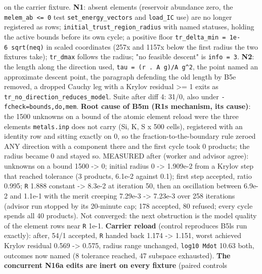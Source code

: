 \documentclass[english,a4paper]{my_memo}
\begin{document}
\begin{itemize}
  on the carrier fixture. \textbf{N1}: absent elements (reservoir abundance
  zero, the \texttt{melem\_ab\ \textless{}=\ 0} test \texttt{set\_energy\_vectors} and \texttt{load\_IC} use)
  are no longer registered as rows; \texttt{initial\_trust\_region\_radius} with
  named statuses, holding the active bounds before its own cycle; a
  positive floor \texttt{tr\_delta\_min\ =\ 1e-6\ sqrt(neq)} in scaled coordinates
  (257x and 1157x below the first radius the two fixtures take); \texttt{tr\_dmax}
  follows the radius; "no feasible descent" is \texttt{info\ =\ 3}. \textbf{N2}: the
  length along the direction used, \texttt{tau\ =\ (r\ .\ A\ g)/\textbar{}\textbar{}A\ g\textbar{}\textbar{}\^{}2}, the point
  named an approximate descent point, the paragraph defending the old
  length by B5e removed, a dropped Cauchy leg with a Krylov residual \textgreater= 1
  exits as \texttt{tr\_no\_direction\_reduces\_model}. Suite after diff 4: 31/0, also
  under \texttt{-fcheck=bounds,do,mem}. \textbf{Root cause of B5m (R1\textquotesingle s mechanism, its
  cause)}: the 1500 unknowns on a bound of the atomic element reload were
  the three elements \texttt{metals.inp} does not carry (Si, K, S x 500 cells),
  registered with an identity row and sitting exactly on 0, so the
  fraction-to-the-boundary rule zeroed ANY direction with a component there
  and the first cycle took 0 products; the radius became 0 and stayed so.
  MEASURED after (worker and advisor agree): unknowns on a bound 1500 -\textgreater{} 0;
  initial radius 0 -\textgreater{} 1.909e-2 from a Krylov step that reached tolerance (3
  products, 6.1e-2 against 0.1); first step accepted, ratio 0.995; \texttt{\textbar{}\textbar{}R\textbar{}\textbar{}}
  1.888 constant -\textgreater{} 8.3e-2 at iteration 50, then an oscillation between
  6.9e-2 and 1.1e-1 with the merit creeping 7.29e-3 -\textgreater{} 7.23e-3 over 258
  iterations (advisor run stopped by its 20-minute cap; 178 accepted, 80
  refused; every cycle spends all 40 products). Not converged: the next
  obstruction is the model quality of the element rows near \texttt{\textbar{}\textbar{}R\textbar{}\textbar{}} 1e-1.
  \textbf{Carrier reload} (control reproduces B5l\textquotesingle s run exactly): after, 54/1
  accepted, \texttt{\textbar{}\textbar{}R\textbar{}\textbar{}} handed back 1.174 -\textgreater{} 1.151, worst achieved Krylov
  residual 0.569 -\textgreater{} 0.575, radius range unchanged, \texttt{log10\ Mdot} 10.63 both,
  outcomes now named (8 tolerance reached, 47 subspace exhausted). \textbf{The
  concurrent N16a edits are inert on every fixture} (paired controls

\end{itemize}
\end{document}

